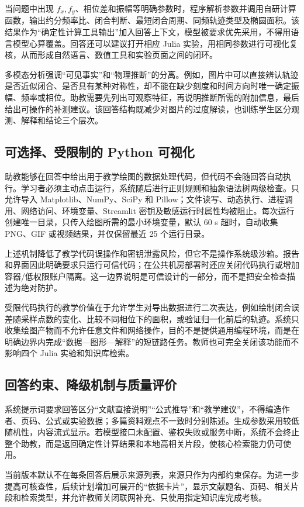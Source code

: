 \documentclass[UTF8,a4paper,zihao=-4]{ctexart}
\begin{document}
当问题中出现 $f_x,f_y$、相位差和振幅等明确参数时，程序解析参数并调用自研计算函数，输出约分频率比、闭合判断、最短闭合周期、同频轨迹类型及椭圆面积。该结果作为“确定性计算工具输出”加入回答上下文，模型被要求优先采用，不得用语言模型心算覆盖。回答还可以建议打开相应 Julia 实验，用相同参数进行可视化复核，从而形成自然语言、数值工具和实验页面之间的闭环。

多模态分析强调“可见事实”和“物理推断”的分离。例如，图片中可以直接辨认轨迹是否近似闭合、是否具有某种对称性，却不能在缺少刻度和时间方向时唯一确定振幅、频率或相位。助教需要先列出可观察特征，再说明推断所需的附加信息，最后给出可操作的补测建议。该回答结构既减少对图片的过度解读，也训练学生区分观测、解释和结论三个层次。

\subsection{可选择、受限制的 Python 可视化}
助教能够在回答中给出用于教学绘图的数据处理代码，但代码不会随回答自动执行。学习者必须主动点击运行，系统随后进行正则规则和抽象语法树两级检查。只允许导入 Matplotlib、NumPy、SciPy 和 Pillow；文件读写、动态执行、进程调用、网络访问、环境变量、Streamlit 密钥及敏感运行时属性均被阻止。每次运行创建唯一目录，只传入绘图所需的最小环境变量，默认 60 s 超时，自动收集 PNG、GIF 或视频结果，并仅保留最近 25 个运行目录。

上述机制降低了教学代码误操作和密钥泄露风险，但它不是操作系统级沙箱。报告和界面因此明确要求只运行可信代码；在公共机房部署时还应关闭代码执行或增加容器/低权限账户隔离。这一边界说明是可信设计的一部分，而不是把安全检查描述为绝对防护。

受限代码执行的教学价值在于允许学生对导出数据进行二次表达，例如绘制闭合误差随采样点数的变化、比较不同相位下的面积，或验证归一化前后的轨迹。系统只收集绘图产物而不允许任意文件和网络操作，目的不是提供通用编程环境，而是在明确边界内完成“数据—图形—解释”的短链路任务。教师也可完全关闭该功能而不影响四个 Julia 实验和知识库检索。

\subsection{回答约束、降级机制与质量评价}
系统提示词要求回答区分“文献直接说明”“公式推导”和“教学建议”，不得编造作者、页码、公式或实验数据；多篇资料观点不一致时分别陈述。生成参数采用较低随机性，内容流式显示。若模型接口未配置、鉴权失败或服务中断，系统不会终止整个助教，而是返回确定性计算结果和本地高相关片段，使核心检索能力仍可使用。

当前版本默认不在每条回答后展示来源列表，来源只作为内部约束保存。为进一步提高可核查性，后续计划增加可展开的“依据卡片”，显示文献题名、页码、相关片段和检索类型，并允许教师关闭联网补充、只使用指定知识库完成考核。
\end{document}
